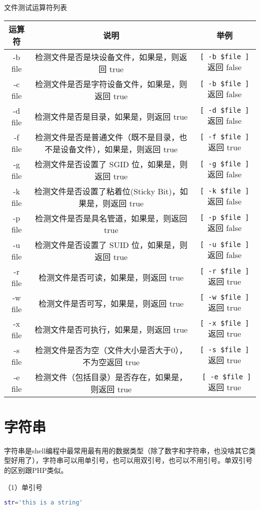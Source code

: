 文件测试运算符列表
{\liuhao
\begin{center}
\begin{tabular}{c|c|c}
运算符&	说明	&举例\\
\hline
-b file	&检测文件是否是块设备文件，如果是，则返回 true&	\verb|[ -b $file ]| 返回 false\\
-c file	&检测文件是否是字符设备文件，如果是，则返回 true&	\verb|[ -b $file ]| 返回 false\\
-d file	&检测文件是否是目录，如果是，则返回 true&	\verb|[ -d $file ]| 返回 false\\
-f file	&检测文件是否是普通文件（既不是目录，也不是设备文件），如果是，则返回 true&	\verb|[ -f $file ]| 返回 true\\
-g file	&检测文件是否设置了 SGID 位，如果是，则返回 true&	\verb|[ -g $file ] |返回 false\\
-k file	&检测文件是否设置了粘着位(Sticky Bit)，如果是，则返回 true& \verb|[ -k $file ] |返回 false\\
-p file	&检测文件是否是具名管道，如果是，则返回 true&	\verb|[ -p $file ] |返回 false\\
-u file	&检测文件是否设置了 SUID 位，如果是，则返回 true&	\verb|[ -u $file ] |返回 false\\
-r file	&检测文件是否可读，如果是，则返回 true	& \verb|[ -r $file ]| 返回 true\\
-w file	&检测文件是否可写，如果是，则返回 true	& \verb|[ -w $file ]| 返回 true\\
-x file	&检测文件是否可执行，如果是，则返回 true&	 \verb|[ -x $file ]| 返回 true\\
-s file	&检测文件是否为空（文件大小是否大于0），不为空返回 true	& \verb|[ -s $file ]| 返回 true\\
-e file	&检测文件（包括目录）是否存在，如果是，则返回 true&	\verb| [ -e $file ]| 返回 true
\end{tabular}
\end{center}}


\section{字符串}
字符串是shell编程中最常用最有用的数据类型（除了数字和字符串，也没啥其它类型好用了），字符串可以用单引号，也可以用双引号，也可以不用引号。单双引号的区别跟PHP类似。

（1）单引号
\begin{lstlisting}[language=sh]
str='this is a string'
\end{lstlisting}

